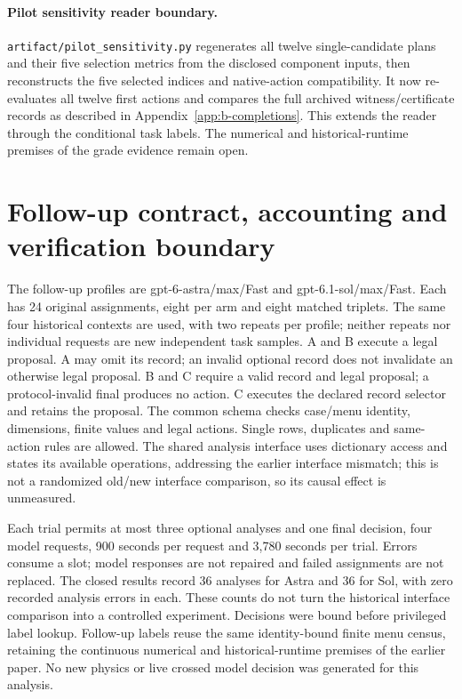 \paragraph{Pilot sensitivity reader boundary.}
\texttt{artifact/pilot\_sensitivity.py} regenerates all twelve single-candidate
plans and their five selection metrics from the disclosed component inputs,
then reconstructs the five selected indices and native-action compatibility.
It now re-evaluates all twelve first actions and compares the full archived
witness/certificate records as described in Appendix~\ref{app:b-completions}.
This extends the reader through the conditional task labels. The numerical
and historical-runtime premises of the grade evidence remain open.


\section{Follow-up contract, accounting and verification boundary}
\label{app:followup}
The follow-up profiles are gpt-6-astra/max/Fast and gpt-6.1-sol/max/Fast.
Each has 24 original assignments, eight per arm and eight matched triplets.
The same four historical contexts are used, with two repeats per profile;
neither repeats nor individual requests are new independent task samples.
A and B execute a legal proposal. A may omit its record; an invalid optional
record does not invalidate an otherwise legal proposal. B and C require a
valid record and legal proposal; a protocol-invalid final produces no action.
C executes the declared record selector and retains the proposal. The common
schema checks case/menu identity, dimensions, finite values and legal actions.
Single rows, duplicates and same-action rules are allowed. The shared
analysis interface uses dictionary access and states its available operations,
addressing the earlier interface mismatch; this is not a randomized old/new
interface comparison, so its causal effect is unmeasured.

Each trial permits at most three optional analyses and one final decision,
four model requests, 900 seconds per request and 3,780 seconds per trial.
Errors consume a slot; model responses are not repaired and failed
assignments are not replaced. The closed results record 36 analyses for
Astra and 36 for Sol, with zero recorded analysis errors in each. These counts
do not turn the historical interface comparison into a controlled experiment.
Decisions were bound before privileged label lookup. Follow-up labels reuse
the same identity-bound finite menu census, retaining the continuous numerical
and historical-runtime premises of the earlier paper. No new physics or
live crossed model decision was generated for this analysis.

